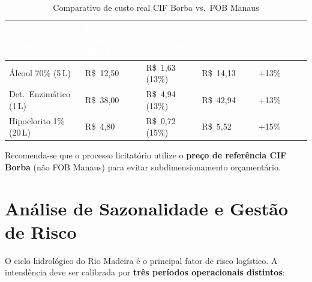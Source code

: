 \documentclass[12pt,a4paper]{article}
\begin{document}
\begin{table}[H]
\centering
\caption{Comparativo de custo real CIF Borba vs.\ FOB Manaus}
\label{tab:custo}
\small
{}
\begin{tabular}{p{4.2cm} >{\centering\arraybackslash}p{2.6cm} >{\centering\arraybackslash}p{2.6cm} >{\centering\arraybackslash}p{2.6cm} >{\centering\arraybackslash}p{1.8cm}}
  \rowcolor{navyblue}
  \textcolor{white}{\textbf{Produto (Classe A)}} &
  \textcolor{white}{\textbf{Preço Manaus (R\$/L)}} &
  \textcolor{white}{\textbf{Frete Estimado}} &
  \textcolor{white}{\textbf{Custo Real (R\$/L)}} &
  \textcolor{white}{\textbf{Majoração}} \\
  \toprule
  Álcool 70\% (5\,L)         & R\$~12{,}50 & R\$~1{,}63 (13\%) & R\$~14{,}13 & +13\% \\
  Det.\ Enzimático (1\,L)   & R\$~38{,}00 & R\$~4{,}94 (13\%) & R\$~42{,}94 & +13\% \\
  Hipoclorito 1\% (20\,L)   & R\$~4{,}80  & R\$~0{,}72 (15\%) & R\$~5{,}52  & +15\% \\
  \bottomrule
\end{tabular}
\end{table}

\begin{recbox}
Recomenda-se que o processo licitatório utilize o \textbf{preço de referência CIF Borba} (não FOB Manaus) para evitar subdimensionamento orçamentário.
\end{recbox}

\section{Análise de Sazonalidade e Gestão de Risco}

O ciclo hidrológico do Rio Madeira é o principal fator de risco logístico. A intendência deve ser calibrada por \textbf{três períodos operacionais distintos}:
\end{document}
